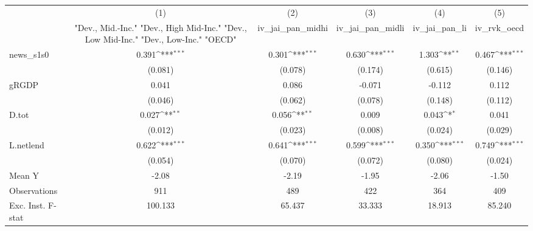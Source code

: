 {
\def\sym#1{\ifmmode^{#1}\else\(^{#1}\)\fi}
\begin{tabular}{l*{5}{c}}
\toprule
            &\multicolumn{1}{c}{(1)}&\multicolumn{1}{c}{(2)}&\multicolumn{1}{c}{(3)}&\multicolumn{1}{c}{(4)}&\multicolumn{1}{c}{(5)}\\
            &\multicolumn{1}{c}{ "Dev., Mid.-Inc." "Dev., High Mid-Inc." "Dev., Low Mid-Inc." "Dev., Low-Inc." "OECD" }&\multicolumn{1}{c}{iv\_jai\_pan\_midhi}&\multicolumn{1}{c}{iv\_jai\_pan\_midli}&\multicolumn{1}{c}{iv\_jai\_pan\_li}&\multicolumn{1}{c}{iv\_rvk\_oecd}\\
\midrule
news\_s1s0   &       0.391\sym{***}&       0.301\sym{***}&       0.630\sym{***}&       1.303\sym{**} &       0.467\sym{***}\\
            &     (0.081)         &     (0.078)         &     (0.174)         &     (0.615)         &     (0.146)         \\
\addlinespace
gRGDP       &       0.041         &       0.086         &      -0.071         &      -0.112         &       0.112         \\
            &     (0.046)         &     (0.062)         &     (0.078)         &     (0.148)         &     (0.112)         \\
\addlinespace
D.tot       &       0.027\sym{**} &       0.056\sym{**} &       0.009         &       0.043\sym{*}  &       0.041         \\
            &     (0.012)         &     (0.023)         &     (0.008)         &     (0.024)         &     (0.029)         \\
\addlinespace
L.netlend   &       0.622\sym{***}&       0.641\sym{***}&       0.599\sym{***}&       0.350\sym{***}&       0.749\sym{***}\\
            &     (0.054)         &     (0.070)         &     (0.072)         &     (0.080)         &     (0.024)         \\
\midrule
Mean Y      &       -2.08         &       -2.19         &       -1.95         &       -2.06         &       -1.50         \\
Observations&         911         &         489         &         422         &         364         &         409         \\
Exc. Inst. F-stat&     100.133         &      65.437         &      33.333         &      18.913         &      85.240         \\
\bottomrule
\end{tabular}
}
